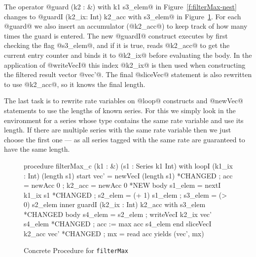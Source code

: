 The operator @guard (k2 : &) with k1 s3_elem@ in Figure~\ref{f:filterMax-nest} changes to @guardI (k2_ix: Int) k2_acc with s3_elem@ in Figure~\ref{f:filterMax-concrete}. For each @guard@ we also insert an accumulator (@k2_acc@) to keep track of how many times the guard is entered. The new @guardI@ construct executes by first checking the flag @s3_elem@, and if it is true, reads @k2_acc@ to get the current entry counter and binds it to @k2_ix@ before evaluating the body. In the application of @writeVecI@ this index @k2_ix@ is then used when constructing the filtered result vector @vec'@. The final @sliceVec@ statement is also rewritten to use @k2_acc@, so it knows the final length.

The last task is to rewrite rate variables on @loop@ constructs and @newVec@ statements to use the lengths of known series. For this we simply look in the environment for a series whose type contains the same rate variable and use its length. If there are multiple series with the same rate variable then we just choose the first one --- as all series tagged with the same rate are guaranteed to have the same length. 


\begin{figure}
\begin{code}
procedure filterMax_c (k1 : &) (s1 : Series k1 Int)
with loopI (k1_ix : Int) (length s1)
 start { vec'     = newVecI (length s1)    *CHANGED
       ; acc      = newAcc  0 
       ; k2_acc   = newAcc  0 }            *NEW
 body  { s1_elem  = nextI k1_ix s1         *CHANGED
       ; s2_elem  = (+ 1) s1_elem
       ; s3_elem  = (> 0) s2_elem  }
 inner guardI (k2_ix : Int) k2_acc with s3_elem            
                                           *CHANGED
       body { s4_elem = s2_elem
            ; writeVecI k2_ix vec' s4_elem *CHANGED
            ; acc    := max acc s4_elem }
 end   { sliceVecI k2_acc vec'             *CHANGED
       ; mx       = read acc }            
yields (vec', mx)
\end{code}
\caption{Concrete Procedure for \texttt{filterMax}}
\label{f:filterMax-concrete}
\end{figure}


